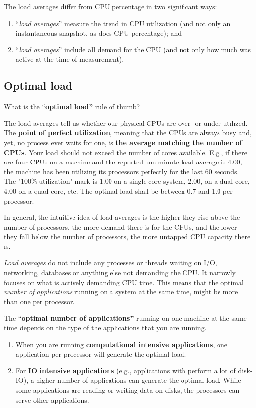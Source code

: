 The load averages differ from CPU percentage in two significant ways:

\begin{enumerate}
\item  ``\textit{load averages}'' measure the trend in CPU utilization (and not only an instantaneous snapshot, as does CPU percentage); and
\item  ``\textit{load averages}'' include all demand for the CPU (and not only how much was active at the time of measurement).
\end{enumerate}

\subsection{Optimal load}

What is the ``\textbf{optimal load''} rule of thumb?

The load averages tell us whether our physical CPUs are over- or under-utilized. The \textbf{point of perfect utilization}, meaning that the CPUs are always busy and, yet, no process ever waits for one, is \textbf{the average matching the number of CPUs}.  Your load should not exceed the number of cores available.  E.g., if there are four CPUs on a machine and the reported one-minute load average is 4.00, the machine has been utilizing its processors perfectly for the last 60 seconds. The "100\% utilization" mark is 1.00 on a single-core system, 2.00, on a dual-core, 4.00 on a quad-core, etc. The optimal load shall be between 0.7 and 1.0 per processor.

In general, the intuitive idea of load averages is the higher they rise above the number of processors, the more demand there is for the CPUs, and the lower they fall below the number of processors, the more untapped CPU capacity there is.

\textit{Load averages} do not include any processes or threads waiting on I/O, networking, databases or anything else not demanding the CPU. It narrowly focuses on what is actively demanding CPU time. This means that the optimal \textit{number of applications} running on a system at the same time, might be more than one per processor.

The ``\textbf{optimal number of applications''} running on one machine at the same time depends on the type of the applications that you are running.

\begin{enumerate}
\item  When you are running \textbf{computational intensive applications}, one application per processor will generate the optimal load.
\item  For \textbf{IO intensive applications} (e.g., applications with perform a lot of disk-IO), a higher number of applications can generate the optimal load. While some applications are reading or writing data on disks, the processors can serve other applications.
\end{enumerate}


